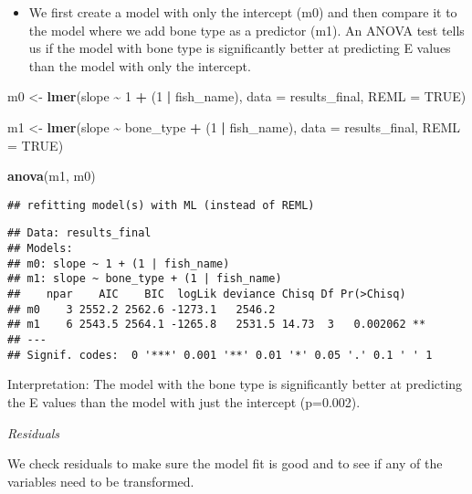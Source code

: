 \documentclass[
]{article}
\newenvironment{Shaded}{\begin{snugshade}}{\end{snugshade}}
\newcommand{\AttributeTok}[1]{\textcolor[rgb]{0.13,0.29,0.53}{#1}}
\newcommand{\ConstantTok}[1]{\textcolor[rgb]{0.56,0.35,0.01}{#1}}
\newcommand{\DecValTok}[1]{\textcolor[rgb]{0.00,0.00,0.81}{#1}}
\newcommand{\FunctionTok}[1]{\textcolor[rgb]{0.13,0.29,0.53}{\textbf{#1}}}
\newcommand{\NormalTok}[1]{#1}
\newcommand{\OtherTok}[1]{\textcolor[rgb]{0.56,0.35,0.01}{#1}}
\newcommand{\SpecialCharTok}[1]{\textcolor[rgb]{0.81,0.36,0.00}{\textbf{#1}}}
\providecommand{\tightlist}{%
  \setlength{\itemsep}{0pt}\setlength{\parskip}{0pt}}
\begin{document}
\begin{itemize}
\tightlist
\item
  We first create a model with only the intercept (m0) and then compare
  it to the model where we add bone type as a predictor (m1). An ANOVA
  test tells us if the model with bone type is significantly better at
  predicting E values than the model with only the intercept.
\end{itemize}

\begin{Shaded}
\begin{Highlighting}[]
\NormalTok{m0 }\OtherTok{\textless{}{-}} \FunctionTok{lmer}\NormalTok{(slope }\SpecialCharTok{\textasciitilde{}}  \DecValTok{1} \SpecialCharTok{+}\NormalTok{ (}\DecValTok{1} \SpecialCharTok{|}\NormalTok{ fish\_name), }\AttributeTok{data =}\NormalTok{ results\_final, }\AttributeTok{REML =} \ConstantTok{TRUE}\NormalTok{)}

\NormalTok{m1 }\OtherTok{\textless{}{-}} \FunctionTok{lmer}\NormalTok{(slope }\SpecialCharTok{\textasciitilde{}}\NormalTok{  bone\_type }\SpecialCharTok{+}\NormalTok{ (}\DecValTok{1} \SpecialCharTok{|}\NormalTok{ fish\_name), }\AttributeTok{data =}\NormalTok{ results\_final, }\AttributeTok{REML =} \ConstantTok{TRUE}\NormalTok{)}

\FunctionTok{anova}\NormalTok{(m1, m0)}
\end{Highlighting}
\end{Shaded}

\begin{verbatim}
## refitting model(s) with ML (instead of REML)
\end{verbatim}

\begin{verbatim}
## Data: results_final
## Models:
## m0: slope ~ 1 + (1 | fish_name)
## m1: slope ~ bone_type + (1 | fish_name)
##    npar    AIC    BIC  logLik deviance Chisq Df Pr(>Chisq)   
## m0    3 2552.2 2562.6 -1273.1   2546.2                       
## m1    6 2543.5 2564.1 -1265.8   2531.5 14.73  3   0.002062 **
## ---
## Signif. codes:  0 '***' 0.001 '**' 0.01 '*' 0.05 '.' 0.1 ' ' 1
\end{verbatim}

Interpretation: The model with the bone type is significantly better at
predicting the E values than the model with just the intercept
(p=0.002).

\emph{Residuals}

We check residuals to make sure the model fit is good and to see if any
of the variables need to be transformed.
\end{document}
